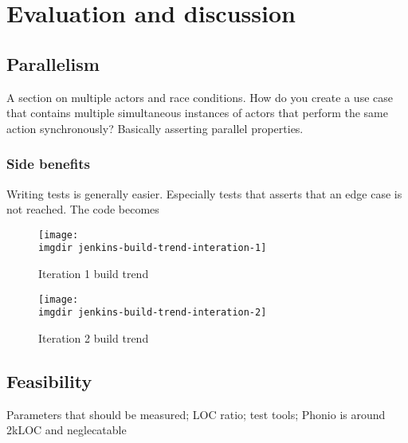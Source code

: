 \chapter{Evaluation and discussion}

\section{Parallelism}
A section on multiple actors and race conditions. How do you create a use case that contains multiple simultaneous instances of actors that perform the same action synchronously? Basically asserting parallel properties.

\subsection{Side benefits}

Writing tests is generally easier. Especially tests that asserts that an edge case is not reached. The code becomes 

\begin{figure}[!hbpt]
\centering
\texttt{[image: \\imgdir jenkins-build-trend-interation-1]}
\caption{Iteration 1 build trend}
\label{fig:jenkins-build-trend-interation-1}
\end{figure}


\begin{figure}[!hbpt]
\centering
\texttt{[image: \\imgdir jenkins-build-trend-interation-2]}
\caption{Iteration 2 build trend}
\label{fig:jenkins-build-trend-interation-2}
\end{figure}


\section{Feasibility}
Parameters that should be measured; LOC ratio; test tools; Phonio is around 2kLOC and neglecatable


